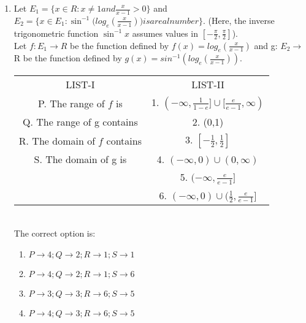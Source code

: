 \begin{enumerate}[label=\arabic*.,ref=\thesubsection.\theenumi]
\item Let $E_1 = \{ x \in R: x \neq 1 and \frac{x}{x-1} > 0\}$ and $E_2 = \{ x \in E_1:\sin^{-1}\Big(log_e(\frac{x}{x-1})\Big) is a real number\}$. (Here, the inverse trigonometric function $\sin^{-1}x$ assumes values in $[-\frac{\pi}{2},\frac{\pi}{2}]$).\\
Let $f: E_1 \rightarrow R$ be the function defined by $f(x)=log_e(\frac{x}{x-1})$ and g: $E_2 \rightarrow$ R be the function defined by $g(x)=sin^{-1}(log_e(\frac{x}{x-1}))$.
\begin{table}[h!]
\centering
\begin{tabular}{c c} 
 LIST-I & LIST-II\\ [0.5ex] 
  P. The range of $f$ is &         1. $(-\infty,\frac{1}{1-e}]\cup[\frac{e}{e-1},\infty)$\\ 
  Q. The range of g contains &     2. (0,1)\\
  R. The domain of $f$ contains &  3. $[-\frac{1}{2},\frac{1}{2}]$\\
  S. The domain of g is &          4. $(-\infty,0)\cup(0,\infty)$\\
                                 & 5. $(-\infty,\frac{e}{e-1}]$\\
                                 & 6. $(-\infty,0)\cup(\frac{1}{2},\frac{e}{e-1}]$\\[1ex] 
\end{tabular}
\end{table}\\
The correct option is:
\begin{enumerate}
\item $P \rightarrow 4; Q \rightarrow 2; R \rightarrow 1; S \rightarrow 1$
\item $P \rightarrow 4; Q \rightarrow 2; R \rightarrow 1; S \rightarrow 6$ 
\item $P \rightarrow 3; Q \rightarrow 3; R \rightarrow 6; S \rightarrow 5$
\item $P \rightarrow 4; Q \rightarrow 3; R \rightarrow 6; S \rightarrow 5$
\end{enumerate} 
\end{enumerate} 

 

